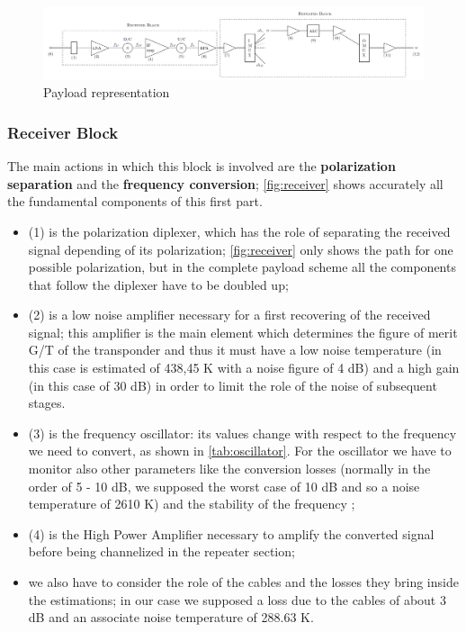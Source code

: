\documentclass[11pt,a4paper,titlepage]{article}
\begin{document}
		\begin{figure}
		\centering
		\includegraphics[width = \textwidth]{Payload.png}
		\caption{Payload representation}
		\label{fig:payload}
		\end{figure}

		\subsubsection{Receiver Block}
The main actions in which this block is involved are the \textbf{polarization separation} and the \textbf{frequency conversion}; \autoref{fig:receiver} shows accurately all the fundamental components of this first part.
		\begin{itemize}
		\item (1) is the polarization diplexer, which has the role of separating the received signal depending of its polarization; \autoref{fig:receiver} only shows the path for one possible polarization, but in the complete payload scheme all the components that follow the diplexer have to be doubled up;
		\item (2) is a low noise amplifier necessary for a first recovering of the received signal; this amplifier is the main element which determines the figure of merit G/T of the transponder and thus it must have a low noise temperature (in this case is estimated of 438,45 K with a noise figure of 4 dB) and a high gain (in this case of 30 dB) in order to limit the role of the noise of subsequent stages.
		\item (3) is the frequency oscillator: its values change with respect to the frequency we need to convert, as shown in \autoref{tab:oscillator}. For the oscillator we have to monitor also other parameters like the conversion losses (normally in the order of 5 - 10 dB, we supposed the worst case of 10 dB and so a noise temperature of 2610 K) and the stability of the frequency \cite{Maral2017};
		\item (4) is the High Power Amplifier necessary to amplify the converted signal before being channelized in the repeater section;
		\item we also have to consider the role of the cables and the losses they bring inside the estimations; in our case we supposed a loss due to the cables of about 3 dB and an associate noise temperature of 288.63 K.
		\end{itemize}
\end{document}
